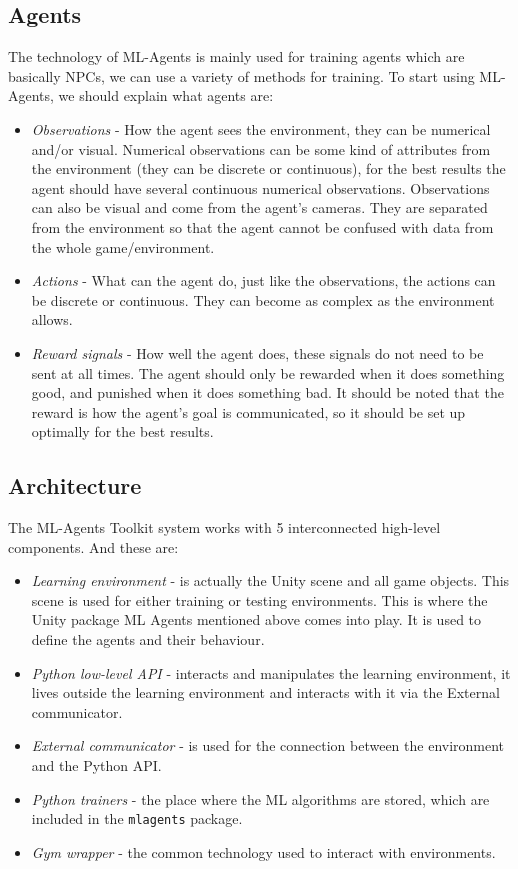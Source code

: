 \documentclass[a4paper,12pt,openright]{book}
\begin{document}
\subsection{Agents}

The technology of ML-Agents is mainly used for training agents which are basically NPCs, we can use a variety of methods for training. To start using ML-Agents, we should explain what agents are:

\begin{itemize} 
    \item \emph{Observations} - How the agent sees the environment, they can be numerical and/or visual. Numerical observations can be some kind of attributes from the environment (they can be discrete or continuous), for the best results the agent should have several continuous numerical observations. Observations can also be visual and come from the agent's cameras. They are separated from the environment so that the agent cannot be confused with data from the whole game/environment. 
    \item \emph{Actions} - What can the agent do, just like the observations, the actions can be discrete or continuous. They can become as complex as the environment allows. 
    \item \emph{Reward signals} - How well the agent does, these signals do not need to be sent at all times. The agent should only be rewarded when it does something good, and punished when it does something bad. It should be noted that the reward is how the agent's goal is communicated, so it should be set up optimally for the best results.
\end{itemize}

\subsection{Architecture}

The ML-Agents Toolkit system works with 5 interconnected high-level components. And these are:

\begin{itemize} 
    \item \emph{Learning environment} - is actually the Unity scene and all game objects. This scene is used for either training or testing environments. This is where the Unity package ML Agents mentioned above comes into play. It is used to define the agents and their behaviour. 
    \item \emph{Python low-level API} - interacts and manipulates the learning environment, it lives outside the learning environment and interacts with it via the External communicator. 
    \item \emph{External communicator} - is used for the connection between the environment and the Python API. 
    \item \emph{Python trainers} - the place where the ML algorithms are stored, which are included in the \texttt{mlagents} package. 
    \item \emph{Gym wrapper} \cite{openAIGym} - the common technology used to interact with environments.
\end{itemize}
\end{document}
